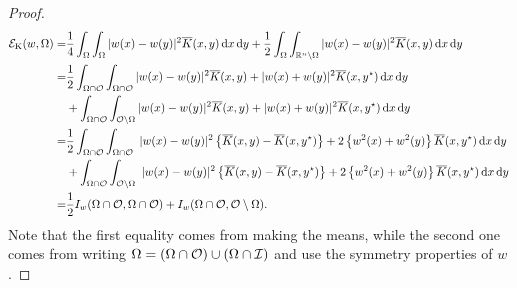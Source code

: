 \begin{proof}
\begin{align*}
\mathcal{E}_\mathrm{K}(w, \Omega) = & \frac{1}{4} \int_{\Omega} \int_{\Omega} |w(x)-w(y)|^2 \overline{K}(x,y) \,\mathrm{d} x \,\mathrm{d} y + \frac{1}{2} \int_{\Omega} \int_{\mathbb{R}^n \setminus \Omega} |w(x)-w(y)|^2 \overline{K}(x,y) \,\mathrm{d} x \,\mathrm{d} y \\
= & \frac{1}{2} \int_{\Omega\cap \mathcal{O}} \int_{\Omega \cap \mathcal{O}} |w(x)-w(y)|^2 \overline{K}(x,y) + |w(x)+w(y)|^2 \overline{K}(x,y^\star) \,\mathrm{d} x \,\mathrm{d} y  \\
& + \int_{\Omega\cap \mathcal{O}} \int_{\mathcal{O} \setminus \Omega} |w(x)-w(y)|^2 \overline{K}(x,y) + |w(x)+w(y)|^2 \overline{K}(x,y^\star) \,\mathrm{d} x \,\mathrm{d} y  \\
= & \frac{1}{2} \int_{\Omega\cap \mathcal{O}} \int_{\Omega \cap \mathcal{O}}  \ |w(x)-w(y)|^2 \left\{ \overline{K}(x,y) - \overline{K}(x,y^\star) \right\}  +2 \left\{w^2(x)+w^2(y)\right\} \overline{K}(x,y^\star) \,\mathrm{d} x \,\mathrm{d} y\,\\
&+ \int_{\Omega\cap \mathcal{O}} \int_{\mathcal{O} \setminus \Omega}  \ |w(x)-w(y)|^2 \left\{ \overline{K}(x,y) - \overline{K}(x,y^\star) \right\}  +2 \left\{w^2(x)+w^2(y)\right\} \overline{K}(x,y^\star) \,\mathrm{d} x \,\mathrm{d} y\,\\
= & \frac{1}{2} I_w(\Omega\cap\mathcal{O},\Omega\cap\mathcal{O}) + I_w(\Omega\cap\mathcal{O},\mathcal{O}\setminus\Omega).
\end{align*}
Note that the first equality comes from making the means, while the second one comes from writing
$\Omega = (\Omega\cap \mathcal{O}) \cup (\Omega\cap \mathcal{I})$ and use the symmetry properties of $w$.
\end{proof}

